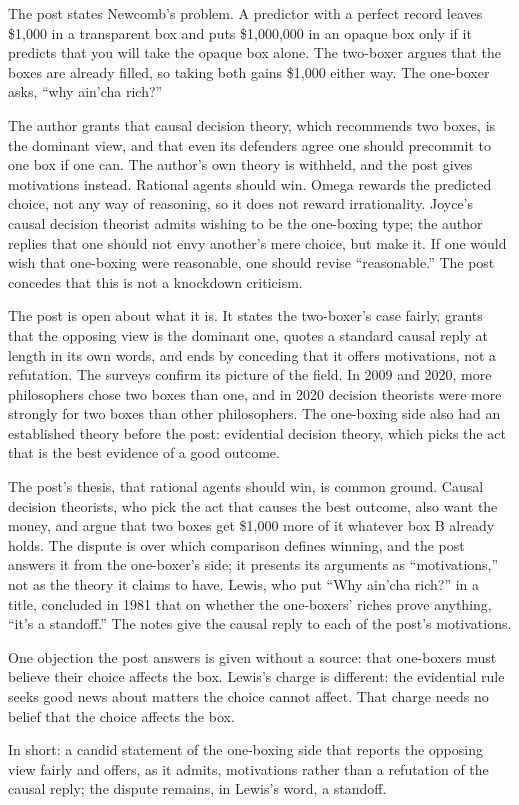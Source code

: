 \begin{afterword}
\summaryhead

The post states Newcomb's problem. A predictor with a perfect record leaves \$1,000 in a transparent box and puts \$1,000,000 in an opaque box only if it predicts that you will take the opaque box alone. The two-boxer argues that the boxes are already filled, so taking both gains \$1,000 either way. The one-boxer asks, ``why ain'cha rich?''

The author grants that causal decision theory, which recommends two boxes, is the dominant view, and that even its defenders agree one should precommit to one box if one can. The author's own theory is withheld, and the post gives motivations instead. Rational agents should win. Omega rewards the predicted choice, not any way of reasoning, so it does not reward irrationality. Joyce's causal decision theorist admits wishing to be the one-boxing type; the author replies that one should not envy another's mere choice, but make it. If one would wish that one-boxing were reasonable, one should revise ``reasonable.'' The post concedes that this is not a knockdown criticism.

\responsehead

The post is open about what it is. It states the two-boxer's case fairly, grants that the opposing view is the dominant one, quotes a standard causal reply at length in its own words, and ends by conceding that it offers motivations, not a refutation. The surveys confirm its picture of the field. In 2009 and 2020, more philosophers chose two boxes than one, and in 2020 decision theorists were more strongly for two boxes than other philosophers. The one-boxing side also had an established theory before the post: evidential decision theory, which picks the act that is the best evidence of a good outcome.

The post's thesis, that rational agents should win, is common ground. Causal decision theorists, who pick the act that causes the best outcome, also want the money, and argue that two boxes get \$1,000 more of it whatever box B already holds. The dispute is over which comparison defines winning, and the post answers it from the one-boxer's side; it presents its arguments as ``motivations,'' not as the theory it claims to have. Lewis, who put ``Why ain'cha rich?'' in a title, concluded in 1981 that on whether the one-boxers' riches prove anything, ``it's a standoff.'' The notes give the causal reply to each of the post's motivations.

One objection the post answers is given without a source: that one-boxers must believe their choice affects the box. Lewis's charge is different: the evidential rule seeks good news about matters the choice cannot affect. That charge needs no belief that the choice affects the box.

In short: a candid statement of the one-boxing side that reports the opposing view fairly and offers, as it admits, motivations rather than a refutation of the causal reply; the dispute remains, in Lewis's word, a standoff.
\end{afterword}
